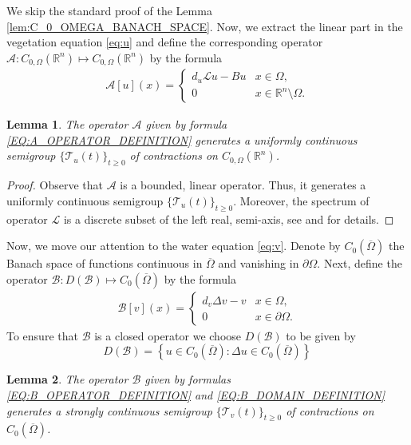 \documentclass[12pt, a4paper]{article}
\theoremstyle{break}
\theoremstyle{break}
\theoremstyle{break}
\theoremstyle{break}
\theoremstyle{break}
\newtheorem{lem}{Lemma}[section]
\theoremstyle{break}
\theoremstyle{break}
\begin{document}
We skip the standard proof of the Lemma \ref{lem:C_0_OMEGA_BANACH_SPACE}. Now, we extract the linear part in the vegetation equation \eqref{eq:u} and define the corresponding operator $\mathcal{A}: C_{0, \Omega}(\mathbb{R}^n) \mapsto C_{0, \Omega}(\mathbb{R}^n)$ by the formula
\begin{align}
    \label{EQ:A_OPERATOR_DEFINITION}
    \mathcal{A}[u](x) =
    \begin{cases}
        d_u\mathcal{L}u - Bu &x \in \Omega, \\
        0 &x \in \mathbb{R}^n \setminus \Omega.
    \end{cases}
\end{align}
\begin{lem}
    \label{lem:A_SEMIGROUP_GENERATOR}
    The operator $\mathcal{A}$ given by formula \eqref{EQ:A_OPERATOR_DEFINITION} generates a uniformly continuous semigroup $\{\mathcal{T}_u(t)\}_{t \geq 0}$ of contractions on $C_{0, \Omega}(\mathbb{R}^n)$.
\end{lem}
\begin{proof}
    Observe that $\mathcal{A}$ is a bounded, linear operator. Thus, it generates a uniformly continuous semigroup $\{\mathcal{T}_u(t)\}_{t \geq 0}$. Moreover, the spectrum of operator $\mathcal{L}$ is a discrete subset of the left real, semi-axis, see \cite[Proposition 3.2]{ChasseigneChavesRossi2006} and \cite[Theorem 2.1]{Tadej2025} for details. 
\end{proof}
Now, we move our attention to the water equation \eqref{eq:v}. Denote by $C_0(\overline{\Omega})$ the Banach space of functions continuous in $\overline{\Omega}$ and vanishing in $\partial\Omega$. Next, define the operator $\mathcal{B}: D(\mathcal{B}) \mapsto C_0(\overline{\Omega})$ by the formula
\begin{align}
    \label{EQ:B_OPERATOR_DEFINITION}
    \mathcal{B}[v](x) = 
    \begin{cases}
        d_v \Delta v - v &x \in \Omega, \\
        0 &x \in \partial \Omega.
    \end{cases}
\end{align}
To ensure that $\mathcal{B}$ is a closed operator we choose $D(\mathcal{B})$ to be given by
\begin{equation}
    \label{EQ:B_DOMAIN_DEFINITION}
    D(\mathcal{B}) = \left\{ u \in C_0(\overline{\Omega}): \Delta u \in C_0(\overline{\Omega}) \right\}
\end{equation}
\begin{lem}
    \label{lem:B_SEMIGROUP_GENERATOR}
    The operator $\mathcal{B}$ given by formulas \eqref{EQ:B_OPERATOR_DEFINITION} and \eqref{EQ:B_DOMAIN_DEFINITION} generates a strongly continuous semigroup $\{\mathcal{T}_v(t)\}_{t \geq 0}$ of contractions on $C_0(\overline{\Omega})$.
\end{lem}
\end{document}
